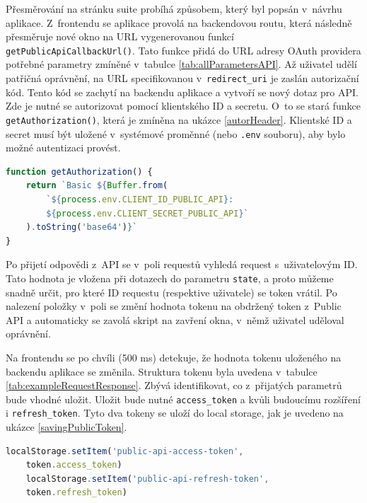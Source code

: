 \documentclass[czech, bc, kiv, he, iso690numb]{fasthesis}
\begin{document}
Přesměrování na stránku suite probíhá způsobem, který byl popsán v~návrhu aplikace. Z~frontendu se aplikace provolá na backendovou routu, která následně přesměruje nové okno
na URL vygenerovanou funkcí \texttt{getPublicApiCallbackUrl()}. Tato funkce přidá do URL adresy OAuth providera potřebné parametry zmíněné v~tabulce \ref{tab:allParametersAPI}.
Až uživatel udělí patřičná oprávnění, na URL specifikovanou v~\texttt{redirect\_uri} je zaslán autorizační kód. Tento kód se zachytí na backendu aplikace a
vytvoří se nový dotaz pro API. Zde je nutné se autorizovat pomocí klientského ID a secretu. O~to se stará funkce \texttt{getAuthorization()}, která je zmíněna na 
ukázce \ref{autorHeader}. Klientské ID a secret musí být uložené v~systémové proměnné (nebo \texttt{.env} souboru), aby bylo možné autentizaci provést.

\begin{lstlisting}[language=Javascript, caption={Vytvoření autorizační hlavičky pro následnou autentizaci}, label=autorHeader]
function getAuthorization() {
	return `Basic ${Buffer.from(
		`${process.env.CLIENT_ID_PUBLIC_API}:
		${process.env.CLIENT_SECRET_PUBLIC_API}`
	).toString('base64')}`
}
\end{lstlisting}

Po přijetí odpovědi z~API se v~poli requestů vyhledá request s~uživatelovým ID. Tato hodnota je vložena při dotazech do parametru \texttt{state}, a proto můžeme snadně
určit, pro které ID requestu (respektive uživatele) se token vrátil. Po nalezení položky v~poli se změní hodnota tokenu na obdržený token z~Public API a automaticky se
zavolá skript na zavření okna, v~němž uživatel uděloval oprávnění.

Na frontendu se po chvíli (500 ms) detekuje, že hodnota tokenu uloženého na backendu aplikace se změnila. Struktura tokenu byla uvedena v~tabulce \ref{tab:exampleRequestResponse}.
Zbývá identifikovat, co z~přijatých parametrů bude vhodné uložit. Uložit bude nutné \texttt{access\_token} a kvůli budoucímu rozšíření i \texttt{refresh\_token}. Tyto
dva tokeny se uloží do local storage, jak je uvedeno na ukázce \ref{savingPublicToken}.

\begin{lstlisting}[language=Javascript, caption={Ukládání Public API tokenů do local storage}, label=savingPublicToken]
	localStorage.setItem('public-api-access-token', 
	token.access_token)
	localStorage.setItem('public-api-refresh-token', 
	token.refresh_token)
\end{lstlisting}
\end{document}
